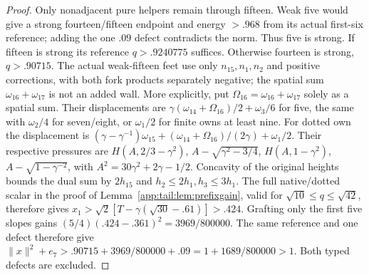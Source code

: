 \documentclass[11pt]{article}
\theoremstyle{definition}
\theoremstyle{remark}
\newcommand{\norm}[1]{\lVert #1\rVert}
\begin{document}
\begin{proof}
Only nonadjacent pure helpers remain through fifteen.
Weak five would give a strong fourteen/fifteen endpoint and
energy $>.968$ from its actual first-six reference; adding
the one $.09$ defect contradicts the norm. Thus five is strong.
If fifteen is strong its reference $q>.9240775$ suffices.
Otherwise fourteen is strong, $q>.90715$.
The actual weak-fifteen feet use only $n_{15},n_1,n_2$ and
positive corrections, with both fork products separately
negative; the spatial sum $\omega_{16}+\omega_{17}$ is not
an added wall. More explicitly, put
$\Omega_{16}=\omega_{16}+\omega_{17}$ solely as a spatial sum.
Their displacements are
$\gamma(\omega_{14}+\Omega_{16})/2+\omega_3/6$ for five,
the same with $\omega_2/4$ for seven/eight, or $\omega_1/2$
for finite owns at least nine. For dotted own the displacement is
$(\gamma-\gamma^{-1})\omega_{15}
+(\omega_{14}+\Omega_{16})/(2\gamma)+\omega_1/2$.
Their respective pressures are
$H(A,2/3-\gamma^2)$, $A-\sqrt{\gamma^2-3/4}$,
$H(A,1-\gamma^2)$, $A-\sqrt{1-\gamma^{-2}}$,
with $A^2=30\gamma^2+2\gamma-1/2$.
Concavity of the original heights bounds the dual sum by
$2h_{15}$ and $h_2\le2h_1,h_3\le3h_1$.
The full native/dotted scalar in the proof of
Lemma~\ref{app:tail:lem:prefixgain}, valid for
$\sqrt{10}\le q\le\sqrt{42}$, therefore gives
$x_1>\sqrt2[T-\gamma(\sqrt{30}-.61)]>.424$.
Grafting only the first five slopes gains
$(5/4)(.424-.361)^2=3969/800000$.
The same reference and one defect therefore give
$\norm x^2+e_7>.90715+3969/800000+.09
=1+1689/800000>1$. Both typed defects are excluded.
\end{proof}
\end{document}
